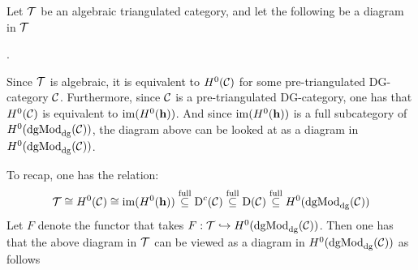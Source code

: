 \begin{remark}
    \label{rem:massey_in_alg_tri_cat}
    Let \( {\mathcal{T}} \) be an algebraic triangulated category, and let the following be a diagram in \( {\mathcal{T}} \)
    \begin{center}
        .
    \end{center}

    Since \( {\mathcal{T}} \) is algebraic, it is equivalent to \( H^0({\mathcal{C}}) \) for some pre-triangulated DG-category \( {\mathcal{C}} \). Furthermore, since \( {\mathcal{C}} \) is a pre-triangulated DG-category, one has that \( H^0({\mathcal{C}}) \) is equivalent to \( \operatorname{im}(H^0(\mathbf{h})) \). And since \( \operatorname{im}(H^0(\mathbf{h})) \) is a full subcategory of \( H^0(\operatorname{dgMod}_{\operatorname{dg}}({\mathcal{C}})) \), the diagram above can be looked at as a diagram in \( H^0(\operatorname{dgMod}_{\operatorname{dg}}({\mathcal{C}})) \).

    To recap, one has the relation:
    \[
        {\mathcal{T}} \cong H^0({\mathcal{C}}) \cong \operatorname{im}(H^0(\mathbf{h})) \stackrel{\text{full}}{\subseteq} \operatorname{D}^c({\mathcal{C}}) \stackrel{\text{full}}{\subseteq} \operatorname{D}({\mathcal{C}}) \stackrel{\text{full}}{\subseteq} H^0(\operatorname{dgMod}_{\operatorname{dg}}({\mathcal{C}}))
    \]
    Let \( F \) denote the functor that takes \( F: {\mathcal{T}} \hookrightarrow H^0(\operatorname{dgMod}_{\operatorname{dg}}({\mathcal{C}})) \). Then one has that the above diagram in \( {\mathcal{T}} \) can be viewed as a diagram in \( H^0(\operatorname{dgMod}_{\operatorname{dg}}({\mathcal{C}})) \) as follows
    \begin{center}
    \end{center}
    

\end{remark}
